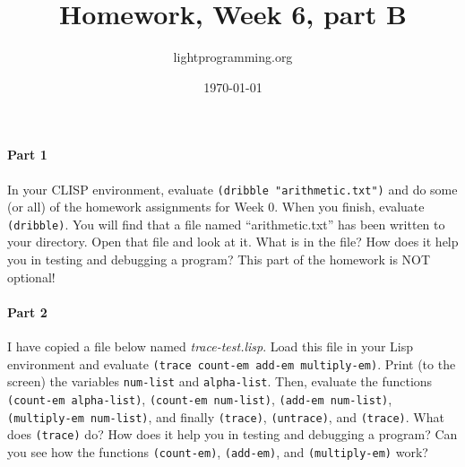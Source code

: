 \documentclass{article}
\title{Homework, Week 6, part B}
\author{lightprogramming.org}
\date{\today}
\begin{document}
\maketitle{}

\paragraph{Part 1}In your CLISP environment, evaluate \texttt{(dribble "arithmetic.txt")} and do some (or all) of the homework assignments for Week 0. When you finish, evaluate \texttt{(dribble)}. You will find that a file named ``arithmetic.txt'' has been written to your directory. Open that file and look at it. What is in the file? How does it help you in testing and debugging a program? This part of the homework is NOT optional!

\paragraph{Part 2}I have copied a file below named \textit{trace-test.lisp}. Load this file in your Lisp environment and evaluate \texttt{(trace count-em add-em multiply-em)}. Print (to the screen) the variables \texttt{num-list} and \texttt{alpha-list}. Then, evaluate the functions \texttt{(count-em alpha-list)}, \texttt{(count-em num-list)}, \texttt{(add-em num-list)}, \texttt{(multiply-em num-list)}, and finally \texttt{(trace)}, \texttt{(untrace)}, and \texttt{(trace)}. What does \texttt{(trace)} do? How does it help you in testing and debugging a program? Can you see how the functions \texttt{(count-em)}, \texttt{(add-em)}, and \texttt{(multiply-em)} work?
\end{document}
